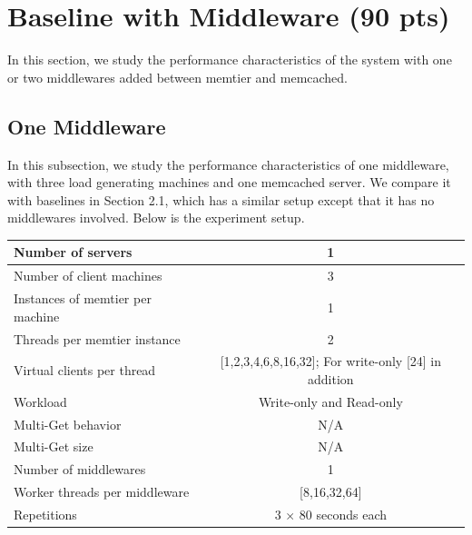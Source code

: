 \section{Baseline with Middleware (90 pts)}


In this section, we study the performance characteristics of the system with one or two middlewares added between memtier and memcached.


\subsection{One Middleware}

In this subsection, we study the performance characteristics of one middleware, with three load generating machines and one memcached server. We compare it with baselines in Section 2.1, which has a similar setup except that it has no middlewares involved. Below is the experiment setup.

\begin{center}
	\scriptsize{
		\begin{tabular}{|l|c|}
			\hline Number of servers                & 1                        \\ 
			\hline Number of client machines        & 3                        \\ 
			\hline Instances of memtier per machine & 1                        \\ 
			\hline Threads per memtier instance     & 2                        \\
			\hline Virtual clients per thread       & [1,2,3,4,6,8,16,32]; For write-only [24] in addition \\
			\hline Workload                         & Write-only and Read-only \\
			\hline Multi-Get behavior               & N/A                      \\
			\hline Multi-Get size                   & N/A                      \\
			\hline Number of middlewares            & 1                        \\
			\hline Worker threads per middleware    & [8,16,32,64]                  \\
			\hline Repetitions                      & 3 $\times$ 80 seconds each                \\ 
			\hline 
		\end{tabular}
	} 
\end{center}


